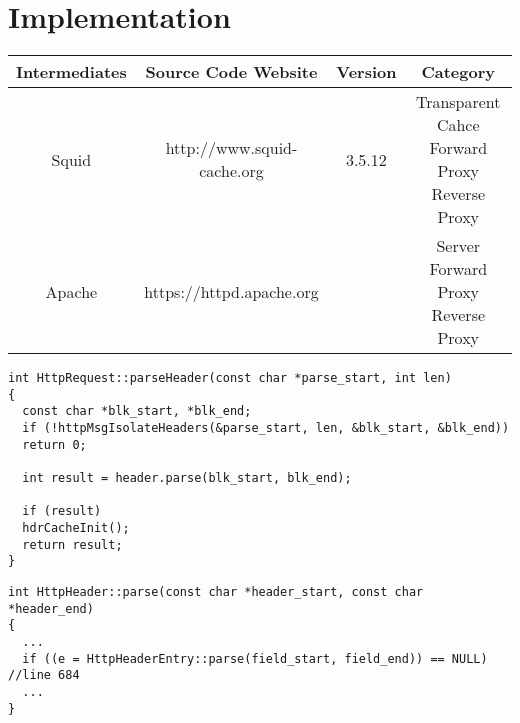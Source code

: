 \section{Implementation}

\begin{tabular}{|c|c|c|c|}
	\hline 
	\textbf{ Intermediates} & \textbf{Source Code Website} & \textbf{Version} & \textbf{Category} \\ 
	\hline 
	\hline 
	Squid & http://www.squid-cache.org & 3.5.12 & \makecell{Transparent Cahce\\Forward Proxy\\Reverse Proxy} \\ 
	\hline 
	Apache & https://httpd.apache.org & &\makecell{Server\\ Forward Proxy\\ Reverse Proxy}\\
	\hline
\end{tabular} 

\begin{lstlisting}[title= squid/src/HttpRequest.cc line:339]
int HttpRequest::parseHeader(const char *parse_start, int len)
{
  const char *blk_start, *blk_end;
  if (!httpMsgIsolateHeaders(&parse_start, len, &blk_start, &blk_end))
  return 0;

  int result = header.parse(blk_start, blk_end);

  if (result)
  hdrCacheInit();
  return result;
}
\end{lstlisting}

\begin{lstlisting}[title=squid/src/HttpHeader.cc line:588]
int HttpHeader::parse(const char *header_start, const char *header_end)
{
  ...
  if ((e = HttpHeaderEntry::parse(field_start, field_end)) == NULL) //line 684
  ...
}
\end{lstlisting}

